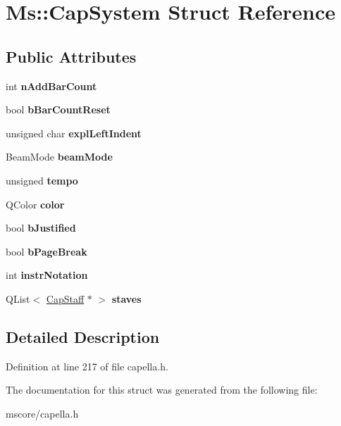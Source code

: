 \hypertarget{struct_ms_1_1_cap_system}{}\section{Ms\+:\+:Cap\+System Struct Reference}
\label{struct_ms_1_1_cap_system}
\subsection*{Public Attributes}
\begin{DoxyCompactItemize}
\item 
\mbox{\label{struct_ms_1_1_cap_system_a166e53cbe609ec7f465b1fc5a7e143cb}} 
int {\bfseries n\+Add\+Bar\+Count}
\item 
\mbox{\label{struct_ms_1_1_cap_system_a3509d7ccf84567319ffc4d422628e3a9}} 
bool {\bfseries b\+Bar\+Count\+Reset}
\item 
\mbox{\label{struct_ms_1_1_cap_system_aee68478ab601fda5c88b950752e06aab}} 
unsigned char {\bfseries expl\+Left\+Indent}
\item 
\mbox{\label{struct_ms_1_1_cap_system_af4234fb8a48f8e3ccd6b7bbbb3d55d40}} 
Beam\+Mode {\bfseries beam\+Mode}
\item 
\mbox{\label{struct_ms_1_1_cap_system_aae92b1a53472a1c97d1bb6234ca5b9c6}} 
unsigned {\bfseries tempo}
\item 
\mbox{\label{struct_ms_1_1_cap_system_a8ebf36074a842d477ee601c08e2b6a6a}} 
Q\+Color {\bfseries color}
\item 
\mbox{\label{struct_ms_1_1_cap_system_a1413f6d41e1eb878b6dc7561bb15fb03}} 
bool {\bfseries b\+Justified}
\item 
\mbox{\label{struct_ms_1_1_cap_system_a138141ca278256a5f575676dcc5f8fab}} 
bool {\bfseries b\+Page\+Break}
\item 
\mbox{\label{struct_ms_1_1_cap_system_a3888174e364572c0982909758614a254}} 
int {\bfseries instr\+Notation}
\item 
\mbox{\label{struct_ms_1_1_cap_system_a5ddb18db409c89aa139e23a5abbc3b23}} 
Q\+List$<$ \hyperlink{struct_ms_1_1_cap_staff}{Cap\+Staff} $\ast$ $>$ {\bfseries staves}
\end{DoxyCompactItemize}


\subsection{Detailed Description}


Definition at line 217 of file capella.\+h.



The documentation for this struct was generated from the following file\+:\begin{DoxyCompactItemize}
\item 
mscore/capella.\+h\end{DoxyCompactItemize}

